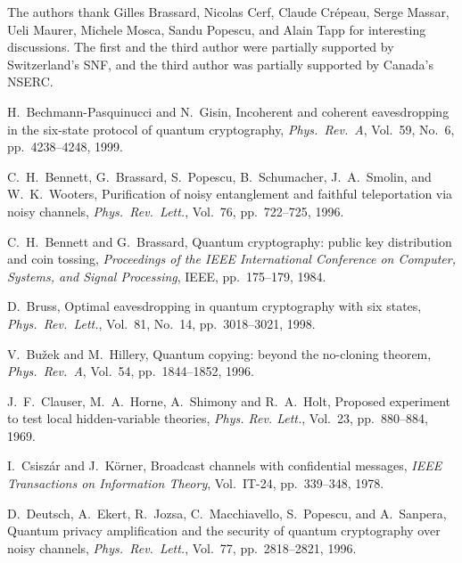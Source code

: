 \documentclass{article}
\begin{document}
The authors thank Gilles Brassard, Nicolas Cerf, Claude Cr\'epeau, 
Serge Massar, 
Ueli Maurer,  Michele Mosca, 
Sandu Popescu, and Alain Tapp for interesting discussions. 
The first and the third author were partially supported by 
Switzerland's SNF,  and the third author was partially supported by 
 Canada's NSERC.





\begin{thebibliography}{10}

H.~Bechmann-Pasquinucci and N.~Gisin,
Incoherent and coherent eavesdropping in the six-state protocol
of quantum cryptography, {\em Phys.\ Rev.~A}, Vol.~59, No.~6,
pp.~4238--4248, 1999.

       C.~H.~Bennett, G.~Brassard, S.~Popescu,
B.~Schumacher, J.~A.~Smolin, and W.~K.~Wooters,
Purification of noisy entanglement and faithful teleportation
via noisy channels,
{\em Phys.\ Rev.\ Lett.}, Vol.~76, pp.~722--725, 1996.

C.~H.~Bennett and G.\ Brassard, 
Quantum cryptography: public key distribution and coin tossing,
{\it Proceedings of
the IEEE International Conference on Computer, Systems, and Signal
Processing}, IEEE, pp.~175--179, 1984.


D.\ Bruss, Optimal eavesdropping in quantum cryptography
with six states, {\em Phys.\ Rev.\ Lett.}, Vol.~81, No.~14, pp.~3018--3021, 1998.

V.\ Bu\v{z}ek and M.\ Hillery, 
Quantum copying: beyond the no-cloning theorem,
{\em Phys.\ Rev.~A}, Vol.\ 54, pp.~1844--1852, 1996.
       


J.\, F.~Clauser, M.\, A.~Horne, A.~Shimony and R.\, A.\ Holt,
Proposed experiment to test local hidden-variable theories,
{\it Phys. Rev. Lett.}, Vol.~23, pp.~880--884, 1969. 



 I.~Csisz\'{a}r and J.~K\"orner, 
Broadcast channels with confidential messages, 
{\em IEEE Transactions on Information Theory\/}, 
Vol.~IT-24, pp.~339--348, 1978.


 D.\ Deutsch, A.\ Ekert, R.\ Jozsa, C.\ Macchiavello,
S.\ Popescu, and A.\ Sanpera, Quantum privacy amplification and the 
security of 
quantum cryptography over
noisy channels, {\em Phys.\ Rev.\ Lett.}, Vol.~77, pp.~2818--2821, 1996.



\end{thebibliography}
\end{document}
